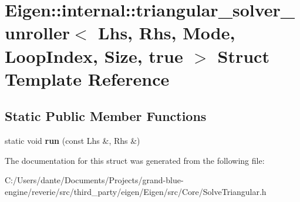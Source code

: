 \hypertarget{struct_eigen_1_1internal_1_1triangular__solver__unroller_3_01_lhs_00_01_rhs_00_01_mode_00_01_loo770c06e8f4c15ef547184369307ea3d8}{}\section{Eigen\+::internal\+::triangular\+\_\+solver\+\_\+unroller$<$ Lhs, Rhs, Mode, Loop\+Index, Size, true $>$ Struct Template Reference}
\label{struct_eigen_1_1internal_1_1triangular__solver__unroller_3_01_lhs_00_01_rhs_00_01_mode_00_01_loo770c06e8f4c15ef547184369307ea3d8}
\subsection*{Static Public Member Functions}
\begin{DoxyCompactItemize}
\item 
\mbox{\label{struct_eigen_1_1internal_1_1triangular__solver__unroller_3_01_lhs_00_01_rhs_00_01_mode_00_01_loo770c06e8f4c15ef547184369307ea3d8_afbd7c6ee84a0fe7bc21df5f3853573d5}} 
static void {\bfseries run} (const Lhs \&, Rhs \&)
\end{DoxyCompactItemize}


The documentation for this struct was generated from the following file\+:\begin{DoxyCompactItemize}
\item 
C\+:/\+Users/dante/\+Documents/\+Projects/grand-\/blue-\/engine/reverie/src/third\+\_\+party/eigen/\+Eigen/src/\+Core/Solve\+Triangular.\+h\end{DoxyCompactItemize}
